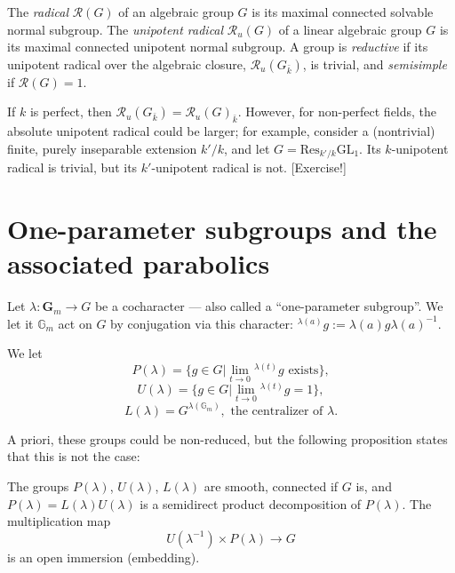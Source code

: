 \begin{definition}
\label{definition-reductive}
The {\it radical} $\mathcal R(G)$ of an algebraic group $G$ is its maximal connected solvable normal subgroup. The {\it unipotent radical} $\mathcal R_u(G)$ of a linear algebraic group $G$ is its maximal connected unipotent normal subgroup. A group is {\it reductive} if its unipotent radical over the algebraic closure, $\mathcal R_u(G_{\bar k})$, is trivial, and {\it semisimple} if $\mathcal R(G)=1$.
\end{definition}

\begin{remark}
 \label{remark-unipotent-radical}
If $k$ is perfect, then $\mathcal R_u(G_{\bar k}) = \mathcal R_u(G)_{\bar k}$. However, for non-perfect fields, the absolute unipotent radical could be larger; for example, consider a (nontrivial) finite, purely inseparable extension $k'/k$, and let $G = \text{Res}_{k'/k}\text{GL}_1$. Its $k$-unipotent radical is trivial, but its $k'$-unipotent radical is not. [Exercise!]
\end{remark}



\section{One-parameter subgroups and the associated parabolics}
\label{section-one-parameter}

Let $\lambda:\mathbf{G}_m \to G$ be a cocharacter --- also called a ``one-parameter subgroup''. We let it $\mathbb G_m$ act on $G$ by conjugation via this character: $^{\lambda(a)}g:= \lambda(a) g \lambda(a)^{-1}$.

We let 
$$P(\lambda)=\{g\in G| \lim_{t\to 0} {^{\lambda(t)}g} \mbox{ exists}\},$$  
$$U(\lambda)=\{g\in G| \lim_{t\to 0} {^{\lambda(t)}g} =1\},$$
$$L(\lambda)= G^{\lambda(\mathbb G_m)},\mbox{ the centralizer of }\lambda.$$

A priori, these groups could be non-reduced, but the following proposition states that this is not the case:

\begin{proposition}
 \label{proposition-cocharacters-parabolics}
The groups $P(\lambda)$, $U(\lambda)$, $L(\lambda)$ are smooth, connected if $G$ is, and $P(\lambda)=L(\lambda)U(\lambda)$ is a semidirect product decomposition of $P(\lambda)$. The multiplication map 
$$ U(\lambda^{-1})\times P(\lambda)\to G$$
is an open immersion (embedding).
\end{proposition}

